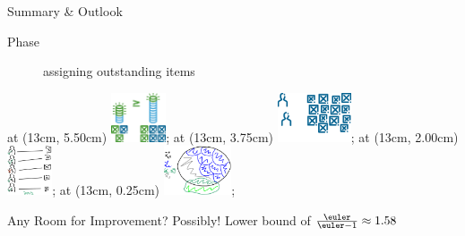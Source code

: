 \begin{frame}{Summary \& Outlook}
\begin{itemize}
\begin{description}
			\item[Phase \phaseiii]
			assigning outstanding items
		\end{description}
	\end{itemize}
	\beamerimage at (13cm, 5.50cm) {\includegraphics[height=1.45cm]{img/diminishingreturns}};
	\beamerimage at (13cm, 3.75cm) {\includegraphics[height=1.45cm]{img/nvsm}};
	\beamerimage at (13cm, 2.00cm) {\includegraphics[height=1.45cm]{img/outstanding_1}};
	\beamerimage at (13cm, 0.25cm) {\includegraphics[height=1.45cm]{img/anal2_1}};
	\begin{minipage}{0.66\textwidth}
		\begin{block}{Any Room for Improvement?}
			Possibly! Lower bound of \(\af \approx 1.58\)
		\end{block}
	\end{minipage}
\end{frame}





\begin{frame}
	\renewcommand{\insertsectionnumber}{!}
	\renewcommand{\insertsection}{End of Talk}
	\sectionpage
\end{frame}